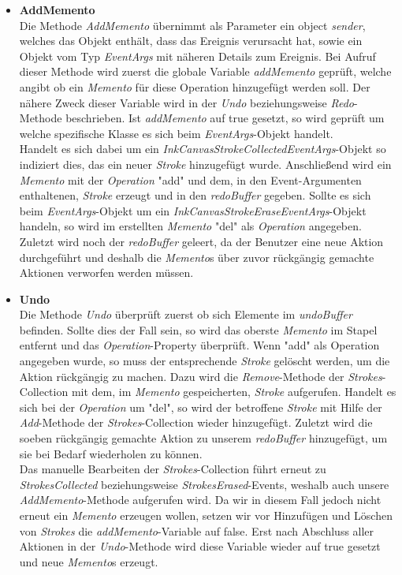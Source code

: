 \begin{itemize}
\item \textbf{AddMemento}\\
Die Methode \textit{AddMemento} übernimmt als Parameter ein object \textit{sender}, welches das Objekt enthält, dass das Ereignis verursacht hat, sowie ein Objekt vom Typ \textit{EventArgs} mit näheren Details zum Ereignis. Bei Aufruf dieser Methode wird zuerst die globale Variable \textit{addMemento} geprüft, welche angibt ob ein \textit{Memento} für diese Operation hinzugefügt werden soll. Der nähere Zweck dieser Variable wird in der \textit{Undo} beziehungsweise \textit{Redo}-Methode beschrieben. Ist \textit{addMemento} auf true gesetzt, so wird geprüft um welche spezifische Klasse es sich beim \textit{EventArgs}-Objekt handelt.\\
Handelt es sich dabei um ein \textit{InkCanvasStrokeCollectedEventArgs}-Objekt so indiziert dies, das ein neuer \textit{Stroke} hinzugefügt wurde. Anschließend wird ein \textit{Memento} mit der \textit{Operation} "add" und dem, in den Event-Argumenten enthaltenen, \textit{Stroke} erzeugt und in den \textit{redoBuffer} gegeben. Sollte es sich beim \textit{EventArgs}-Objekt um ein \textit{InkCanvasStrokeEraseEventArgs}-Objekt handeln, so wird im erstellten \textit{Memento} "del" als \textit{Operation} angegeben. Zuletzt wird noch der \textit{redoBuffer} geleert, da der Benutzer eine neue Aktion durchgeführt und deshalb die \textit{Memento}s über zuvor rückgängig gemachte Aktionen verworfen werden müssen.
\item \textbf{Undo}\\
Die Methode \textit{Undo} überprüft zuerst ob sich Elemente im \textit{undoBuffer} befinden. Sollte dies der Fall sein, so wird das oberste \textit{Memento} im Stapel entfernt und das \textit{Operation}-Property überprüft. Wenn "add" als Operation angegeben wurde, so muss der entsprechende \textit{Stroke} gelöscht werden, um die Aktion rückgängig zu machen. Dazu wird die \textit{Remove}-Methode der \textit{Strokes}-Collection mit dem, im \textit{Memento} gespeicherten, \textit{Stroke} aufgerufen. Handelt es sich bei der \textit{Operation} um "del", so wird der betroffene \textit{Stroke} mit Hilfe der \textit{Add}-Methode der \textit{Strokes}-Collection wieder hinzugefügt. Zuletzt wird die soeben rückgängig gemachte Aktion zu unserem \textit{redoBuffer} hinzugefügt, um sie bei Bedarf wiederholen zu können.\\
Das manuelle Bearbeiten der \textit{Strokes}-Collection führt erneut zu \textit{StrokesCollected} beziehungsweise \textit{StrokesErased}-Events, weshalb auch unsere \textit{AddMemento}-Methode aufgerufen wird. Da wir in diesem Fall jedoch nicht erneut ein \textit{Memento} erzeugen wollen, setzen wir vor Hinzufügen und Löschen von \textit{Strokes} die \textit{addMemento}-Variable auf false. Erst nach Abschluss aller Aktionen in der \textit{Undo}-Methode wird diese Variable wieder auf true gesetzt und neue \textit{Memento}s erzeugt. 

\end{itemize}
